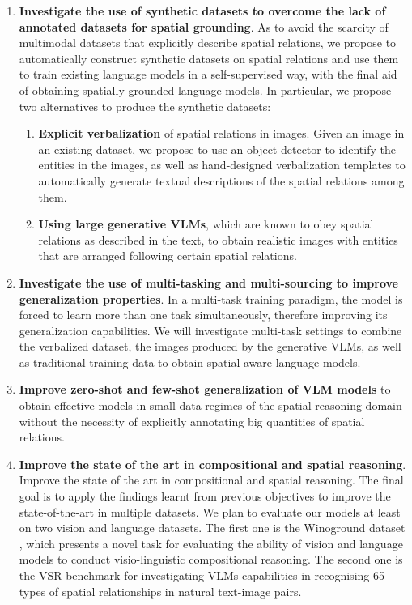 \begin{enumerate}
    \item \textbf{Investigate the use of synthetic datasets to overcome the lack of annotated datasets for spatial grounding}. As to avoid the scarcity of multimodal datasets that explicitly describe spatial relations, we propose to automatically construct synthetic datasets on spatial relations and use them to train existing language models in a self-supervised way, with the final aid of obtaining spatially grounded language models. In particular, we propose two alternatives to produce the synthetic datasets:
    \begin{enumerate}
        \item \textbf{Explicit verbalization} of spatial relations in images. Given an image in an existing dataset, we propose to use an object detector to identify the entities in the images, as well as hand-designed verbalization templates to automatically generate textual descriptions of the spatial relations among them.
        \item \textbf{Using large generative VLMs}, which are known to obey spatial relations as described in the text, to obtain realistic images with entities that are arranged following certain spatial relations.
    \end{enumerate}
    \item \textbf{Investigate the use of multi-tasking and multi-sourcing to improve generalization properties}. In a multi-task training paradigm, the model is forced to learn more than one task simultaneously, therefore improving its generalization capabilities. We will investigate multi-task settings to combine the verbalized dataset, the images produced by the generative VLMs, as well as traditional training data to obtain spatial-aware language models.
    \item \textbf{Improve zero-shot and few-shot generalization of VLM models} to obtain effective models in small data regimes of the spatial reasoning domain without the necessity of explicitly annotating big quantities of spatial relations.
    \item \textbf{Improve the state of the art in compositional and spatial reasoning}. Improve the state of the art in compositional and spatial reasoning. The final goal is to apply the findings learnt from previous objectives to improve the state-of-the-art in multiple datasets. We plan to evaluate our models at least on two vision and language datasets. The first one is the Winoground dataset \cite{thrush2022winoground}, which presents a novel task for evaluating the ability of vision and language models to conduct visio-linguistic compositional reasoning. The second one is the VSR benchmark \cite{liu2022visual} for investigating VLMs capabilities in recognising 65 types of spatial relationships in natural text-image pairs.
\end{enumerate}

